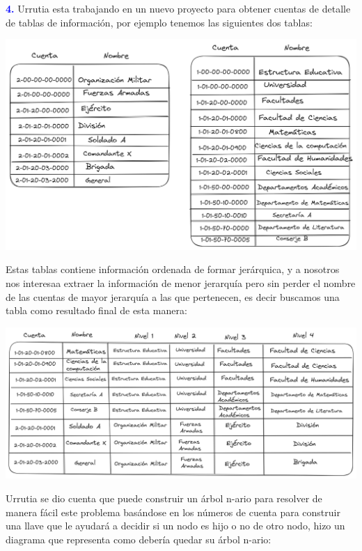 \textbf{\textcolor{blue}{4.}} Urrutia esta trabajando en un nuevo proyecto para obtener cuentas de detalle de tablas de información, por ejemplo tenemos las siguientes dos tablas:

\begin{center}
    \includegraphics[scale=0.2]{../Image/Tablas.png}
\end{center}
    
Estas tablas contiene información ordenada de formar jerárquica, y a nosotros nos interesaa extraer la información de menor jerarquía pero sin perder el nombre de las cuentas de mayor jerarquía a las que pertenecen, es decir buscamos una tabla como resultado final de esta manera:

\begin{center}
    \includegraphics[scale=0.2]{../Image/Resultado.png}
\end{center}

Urrutia se dio cuenta que puede construir un árbol n-ario para resolver de manera fácil este problema basándose en los números de cuenta para construir una llave que le ayudará a decidir si un nodo es hijo o no de otro nodo, hizo un diagrama que representa como debería quedar su árbol n-ario:
\newpage

